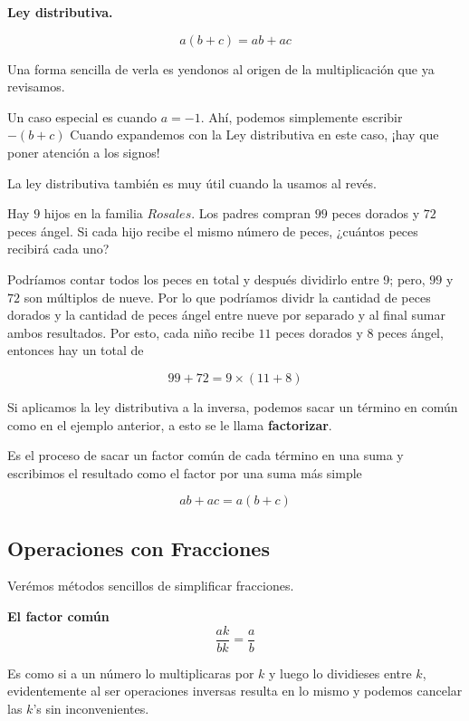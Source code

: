 \textbf{Ley distributiva.}

\[a(b+c) = ab+ac\]

Una forma sencilla de verla es yendonos al origen de la 
multiplicación que ya revisamos.

Un caso especial es cuando $a=-1$. Ahí, podemos simplemente 
escribir $-(b+c)$ Cuando expandemos con la Ley distributiva 
en este caso, ¡hay que poner 
atención a los signos!

La ley distributiva también es muy útil cuando la usamos al 
revés.

\begin{example}
    Hay $9$ hijos en la familia $Rosales$. Los padres 
    compran $99$ peces dorados y $72$ peces ángel. Si cada 
    hijo recibe el mismo número de peces, ¿cuántos peces recibirá 
    cada uno?
\end{example}

\begin{soln}
    Podríamos contar todos los peces en total y después 
    dividirlo entre 9; pero, $99$ y $72$ son múltiplos de nueve. 
    Por lo que podríamos dividr la cantidad de peces dorados 
    y la cantidad de peces ángel entre nueve por separado y 
    al final sumar ambos resultados. Por esto, cada niño 
    recibe $11$ peces dorados y $8$ peces ángel, entonces hay un 
    total de
    
    \[99+72 = 9\times (11+8) \]
\end{soln}

Si aplicamos la ley distributiva a la inversa, podemos 
sacar un término en común como en el ejemplo anterior, 
a esto se le llama \textbf{factorizar}.

\begin{definition}[Factorizar]
    Es el proceso de sacar un factor común de cada término 
    en una suma y escribimos el resultado como el factor 
    por una suma más simple 
\end{definition}

\[ab+ac = a(b+c)\]
\subsection{Operaciones con Fracciones}

Verémos métodos sencillos de simplificar fracciones.

\textbf{El factor común}
\[\frac{ak}{bk} = \frac{a}{b}\]

Es como si a un número lo multiplicaras por $k$ y luego lo 
dividieses entre $k$, evidentemente al ser operaciones inversas 
resulta en lo mismo y podemos cancelar las $k$'s sin inconvenientes.


